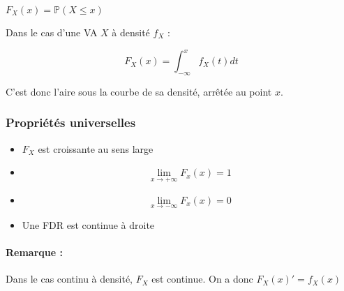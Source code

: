 \documentclass{article}
\begin{document}
$F_{X}(x) = \mathbb{P}(X \leq x)$

Dans le cas d'une VA $X$ à densité $f_{X}$ :

$$F_{X}(x) = \int_{- \infty}^{x} f_{X}(t)dt $$

C'est donc l'aire sous la courbe de sa densité, arrêtée au point $x$.

\subsubsection{Propriétés universelles}

\begin{itemize}
  \item $F_{X}$ est croissante au sens large
  \item $$ \lim_{x \to + \infty} F_{x}(x) = 1 $$
  \item $$ \lim_{x \to - \infty} F_{x}(x) = 0 $$
  \item Une FDR est continue à droite
\end{itemize}

\paragraph{Remarque :} Dans le cas continu à densité, $F_{X}$ est continue.
On a donc $F_{X}(x)' = f_{X}(x)$
\end{document}
